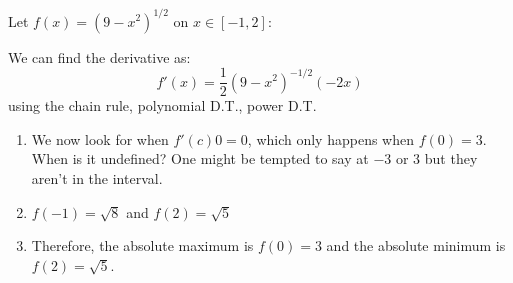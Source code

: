 \begin{itemize}
    \begin{example}
        Let $f(x)=(9-x^2)^{1/2}$ on $x\in[-1,2]$:
        \begin{center}
        \end{center}
        We can find the derivative as:
        \begin{equation}
            f'(x)=\frac{1}{2}(9-x^2)^{-1/2}(-2x)
            \label{eq:}
        \end{equation}
        using the chain rule, polynomial D.T., power D.T. \begin{enumerate}
            \item We now look for when $f'(c)0=0$, which only happens when $f(0)=3$. When is it undefined? One might be tempted to say at $-3$ or $3$ but they aren't in the interval.
            \item $f(-1)=\sqrt{8}$ and $f(2)=\sqrt{5}$
            \item Therefore, the absolute maximum is $f(0)=3$ and the absolute minimum is $f(2)=\sqrt{5}$.
        \end{enumerate}
    \end{example}
\end{itemize}